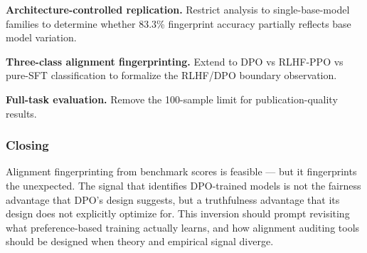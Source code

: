 \textbf{Architecture-controlled replication.} Restrict analysis to single-base-model families
to determine whether 83.3\% fingerprint accuracy partially reflects base model variation.

\textbf{Three-class alignment fingerprinting.} Extend to DPO vs RLHF-PPO vs pure-SFT
classification to formalize the RLHF/DPO boundary observation.

\textbf{Full-task evaluation.} Remove the 100-sample limit for publication-quality results.

\subsubsection{Closing}

Alignment fingerprinting from benchmark scores is feasible --- but it fingerprints the
unexpected. The signal that identifies DPO-trained models is not the fairness advantage
that DPO's design suggests, but a truthfulness advantage that its design does not
explicitly optimize for. This inversion should prompt revisiting what preference-based
training actually learns, and how alignment auditing tools should be designed when
theory and empirical signal diverge.

